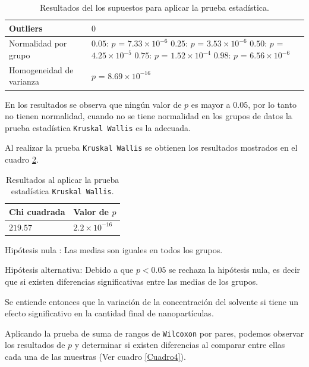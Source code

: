 \documentclass[3p,times,twocolumn]{elsarticle}
\begin{document}
\begin{table}[ht]
\centering
\caption{Resultados del los supuestos para aplicar la prueba estadística.}
\smallskip

\begin{tabular}{ |p{2.1cm}|p{3.5cm}|}
 \hline
 Outliers & $0$ \\
 \hline
 Normalidad por grupo & $0.05$: $p$ = $7.33\times 10^{-6}$ $0.25$: $p$ = $3.53\times 10^{-6}$ $0.50$: $p$ = $4.25\times 10^{-5}$ $0.75$: $p$ = $1.52\times 10^{-4}$ $0.98$: $p$ = $6.56\times 10^{-6}$ \\
 \hline
 Homogeneidad de varianza & $p$ = $8.69\times 10^{-16}$ \\
 \hline
\end{tabular}
\label{Cuadro2}
\end{table}

En los resultados se observa que ningún valor de $p$ es mayor a $0.05$, por lo tanto no tienen normalidad, cuando no se tiene normalidad en los grupos de datos la prueba estadística \texttt{Kruskal Wallis} es la adecuada. 

Al realizar la prueba \texttt{Kruskal Wallis} se obtienen los resultados mostrados en el cuadro \ref{Cuadro3}.

\begin{table}[ht]
\centering
\caption{Resultados al aplicar la prueba estadística \texttt{Kruskal Wallis}.}
\smallskip

\begin{tabular}{ |p{2.1cm}|p{2.1cm}|}
 \hline
 Chi cuadrada & Valor de $p$ \\
 \hline
 $219.57$ & $2.2\times 10^{-16}$ \\
 \hline
\end{tabular}
\label{Cuadro3}
\end{table}

Hipótesis nula : Las medias son iguales en todos los grupos.
\smallskip

Hipótesis alternativa: Debido a que $p < 0.05$ se rechaza la hipótesis nula, es decir que si existen diferencias significativas entre las medias de los grupos. 
\smallskip

Se entiende entonces que la variación de la concentración del solvente si tiene un efecto significativo en la cantidad final de nanopartículas. 

Aplicando la prueba de suma de rangos de \texttt{Wilcoxon} por pares, podemos observar los resultados de $p$ y determinar si existen diferencias al comparar entre ellas cada una de las muestras (Ver cuadro \ref{Cuadro4}).
\end{document}
